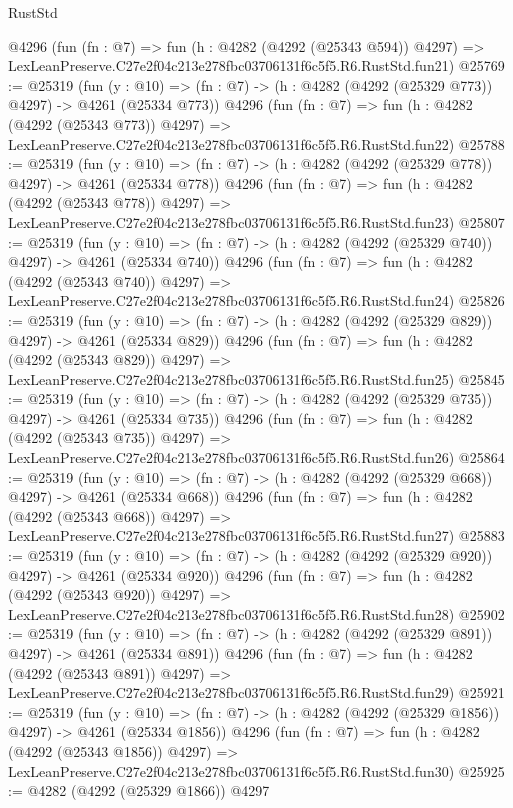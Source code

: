 \begin{lexlean}{RustStd}
\begin{coremodule}
    @4296
    (fun (fn : @7) =>
    fun (h : @4282 (@4292 (@25343 @594)) @4297) =>
    LexLeanPreserve.C27e2f04c213e278fbc03706131f6c5f5.R6.RustStd.fun21)
@25769 := @25319
    (fun (y : @10) => (fn : @7) -> (h : @4282 (@4292 (@25329 @773)) @4297) -> @4261 (@25334 @773))
    @4296
    (fun (fn : @7) =>
    fun (h : @4282 (@4292 (@25343 @773)) @4297) =>
    LexLeanPreserve.C27e2f04c213e278fbc03706131f6c5f5.R6.RustStd.fun22)
@25788 := @25319
    (fun (y : @10) => (fn : @7) -> (h : @4282 (@4292 (@25329 @778)) @4297) -> @4261 (@25334 @778))
    @4296
    (fun (fn : @7) =>
    fun (h : @4282 (@4292 (@25343 @778)) @4297) =>
    LexLeanPreserve.C27e2f04c213e278fbc03706131f6c5f5.R6.RustStd.fun23)
@25807 := @25319
    (fun (y : @10) => (fn : @7) -> (h : @4282 (@4292 (@25329 @740)) @4297) -> @4261 (@25334 @740))
    @4296
    (fun (fn : @7) =>
    fun (h : @4282 (@4292 (@25343 @740)) @4297) =>
    LexLeanPreserve.C27e2f04c213e278fbc03706131f6c5f5.R6.RustStd.fun24)
@25826 := @25319
    (fun (y : @10) => (fn : @7) -> (h : @4282 (@4292 (@25329 @829)) @4297) -> @4261 (@25334 @829))
    @4296
    (fun (fn : @7) =>
    fun (h : @4282 (@4292 (@25343 @829)) @4297) =>
    LexLeanPreserve.C27e2f04c213e278fbc03706131f6c5f5.R6.RustStd.fun25)
@25845 := @25319
    (fun (y : @10) => (fn : @7) -> (h : @4282 (@4292 (@25329 @735)) @4297) -> @4261 (@25334 @735))
    @4296
    (fun (fn : @7) =>
    fun (h : @4282 (@4292 (@25343 @735)) @4297) =>
    LexLeanPreserve.C27e2f04c213e278fbc03706131f6c5f5.R6.RustStd.fun26)
@25864 := @25319
    (fun (y : @10) => (fn : @7) -> (h : @4282 (@4292 (@25329 @668)) @4297) -> @4261 (@25334 @668))
    @4296
    (fun (fn : @7) =>
    fun (h : @4282 (@4292 (@25343 @668)) @4297) =>
    LexLeanPreserve.C27e2f04c213e278fbc03706131f6c5f5.R6.RustStd.fun27)
@25883 := @25319
    (fun (y : @10) => (fn : @7) -> (h : @4282 (@4292 (@25329 @920)) @4297) -> @4261 (@25334 @920))
    @4296
    (fun (fn : @7) =>
    fun (h : @4282 (@4292 (@25343 @920)) @4297) =>
    LexLeanPreserve.C27e2f04c213e278fbc03706131f6c5f5.R6.RustStd.fun28)
@25902 := @25319
    (fun (y : @10) => (fn : @7) -> (h : @4282 (@4292 (@25329 @891)) @4297) -> @4261 (@25334 @891))
    @4296
    (fun (fn : @7) =>
    fun (h : @4282 (@4292 (@25343 @891)) @4297) =>
    LexLeanPreserve.C27e2f04c213e278fbc03706131f6c5f5.R6.RustStd.fun29)
@25921 := @25319
    (fun (y : @10) => (fn : @7) -> (h : @4282 (@4292 (@25329 @1856)) @4297) -> @4261 (@25334 @1856))
    @4296
    (fun (fn : @7) =>
    fun (h : @4282 (@4292 (@25343 @1856)) @4297) =>
    LexLeanPreserve.C27e2f04c213e278fbc03706131f6c5f5.R6.RustStd.fun30)
@25925 := @4282 (@4292 (@25329 @1866)) @4297

\end{coremodule}
\end{lexlean}
